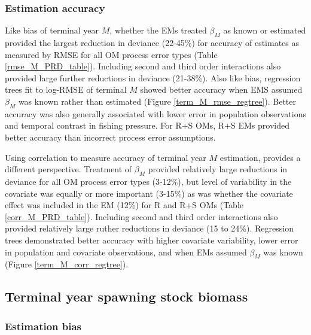 \documentclass[
  12pt,
]{article}
\begin{document}
\subsubsection*{Estimation accuracy}\label{estimation-accuracy}

Like bias of terminal year \(M\), whether the EMs treated \(\beta_M\) as known or estimated provided the largest reduction in deviance (22-45\%) for accuracy of estimates as measured by RMSE for all OM process error types (Table \ref{rmse_M_PRD_table}). Including second and third order interactions also provided large further reductions in deviance (21-38\%). Also like bias, regression trees fit to log-RMSE of terminal \(M\) showed better accuracy when EMS assumed \(\beta_M\) was known rather than estimated (Figure \ref{term_M_rmse_regtree}). Better accuracy was also generally associated with lower error in population observations and temporal contrast in fishing pressure. For R+S OMs, R+S EMs provided better accuracy than incorrect process error assumptions.

Using correlation to measure accuracy of terminal year \(M\) estimation, provides a different perspective. Treatment of \(\beta_M\) provided relatively large reductions in deviance for all OM process error types (3-12\%), but level of variability in the covariate was equally or more important (3-15\%) as was whether the covariate effect was included in the EM (12\%) for R and R+S OMs (Table \ref{corr_M_PRD_table}). Including second and third order interactions also provided relatively large ruther reductions in deviance (15 to 24\%). Regression trees demonstrated better accuracy with higher covariate variability, lower error in population and covariate observations, and when EMs assumed \(\beta_M\) was known (Figure \ref{term_M_corr_regtree}).

\subsection*{Terminal year spawning stock biomass}\label{terminal-year-spawning-stock-biomass}

\subsubsection*{Estimation bias}\label{estimation-bias-3}
\end{document}
